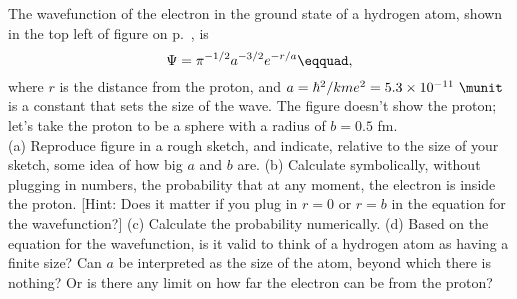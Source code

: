  The wavefunction of the electron in the ground state
of a hydrogen atom, shown in the top left of figure  on p.~\pageref{fig:hydrogen-three-states}, is
\begin{equation*}
            \Psi  =  \pi^{-1/2} a^{-3/2} e^{-r/a}\eqquad,
\end{equation*}
where $r$ is the distance from the proton, and $a=\hbar^2/kme^2=5.3\times10^{-11}\ \munit$
is a constant that sets the size of the wave. The figure doesn't show the proton; let's take the proton to be
a sphere with a radius of $b=0.5$ fm.\\
(a) Reproduce figure  in a rough sketch, and indicate, relative to the size of your sketch,
some idea of how big $a$ and $b$ are.\hwendpart
(b) Calculate symbolically, without plugging in numbers, the
probability that at any moment, the electron is inside the
proton.  [Hint: Does it matter if you plug in $r=0$ or
$r=b$ in the equation for the wavefunction?]\answercheck\hwendpart
(c) Calculate the probability numerically.\answercheck\hwendpart
(d) Based on the equation for the wavefunction, is it valid
to think of a hydrogen atom as having a finite size? Can $a$
be interpreted as the size of the atom, beyond which there
is nothing? Or is there any limit on how far the electron
can be from the proton?\hwendpart
